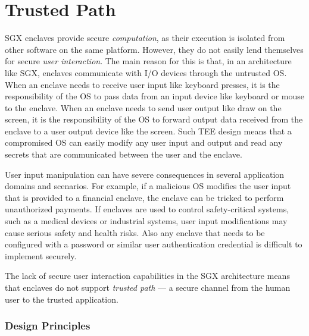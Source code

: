 
\section*{Trusted Path}

SGX enclaves provide secure \emph{computation}, as their execution is isolated from other software on the same platform. However, they do not easily lend themselves for secure \emph{user interaction}. The main reason for this is that, in an architecture like SGX, enclaves communicate with I/O devices through the untrusted OS. When an enclave needs to receive user input like keyboard presses, it is the responsibility of the OS to pass data from an input device like keyboard or mouse to the enclave. When an enclave needs to send user output like draw on the screen, it is the responsibility of the OS to forward output data received from the enclave to a user output device like the screen. Such TEE design means that a compromised OS can easily modify any user input and output and read any secrets that are communicated between the user and the enclave. 

User input manipulation can have severe consequences in several application domains and scenarios. For example, if a malicious OS modifies the user input that is provided to a financial enclave, the enclave can be tricked to perform unauthorized payments. If enclaves are used to control safety-critical systems, such as a medical devices or industrial systems, user input modifications may cause serious safety and health risks. Also any enclave that needs to be configured with a password or similar user authentication credential is difficult to implement securely.

The lack of secure user interaction capabilities in the SGX architecture means that enclaves do not support \emph{trusted path} --- a secure channel from the human user to the trusted application. 



\subsubsection*{Design Principles}

